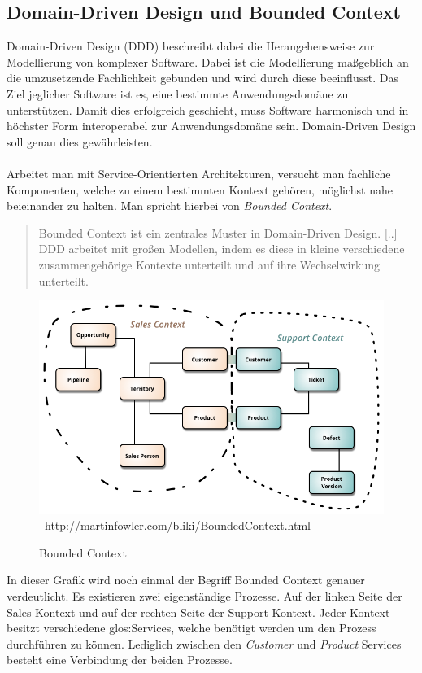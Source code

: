 \subsection{Domain-Driven Design und Bounded Context}
\label{sec:boundedContext}
Domain-Driven Design (DDD) beschreibt dabei die Herangehensweise zur Modellierung von komplexer Software. Dabei ist die Modellierung maßgeblich an die umzusetzende Fachlichkeit gebunden und wird durch diese beeinflusst. Das Ziel jeglicher Software ist es, eine bestimmte Anwendungsdomäne zu unterstützen. Damit dies erfolgreich geschieht, muss Software harmonisch und in höchster Form interoperabel zur Anwendungsdomäne sein. Domain-Driven Design soll genau dies gewährleisten.
\\\\
Arbeitet man mit Service-Orientierten Architekturen, versucht man fachliche Komponenten, welche zu einem bestimmten Kontext gehören, möglichst nahe beieinander zu halten. Man spricht hierbei von \textit{Bounded Context}. 
\begin{quotation}
    \frqq Bounded Context ist ein zentrales Muster in Domain-Driven Design. [..] DDD arbeitet mit großen Modellen, indem es diese in kleine verschiedene zusammengehörige Kontexte unterteilt und auf ihre Wechselwirkung unterteilt.\flqq\ \cite{mfowler:BoundedContext}
\end{quotation}

\begin{figure}[htb]
    \centering 
    \includegraphics[width=\linewidth]{content/images/BoundedContext}\
    \quelle\url{http://martinfowler.com/bliki/BoundedContext.html}
    \caption[Bounded Context]{Bounded Context\\}
    \label{fig:BoundedContext}  
\end{figure} 
In dieser Grafik wird noch einmal der Begriff Bounded Context genauer verdeutlicht. Es existieren zwei eigenständige Prozesse. Auf der linken Seite der Sales Kontext und auf der rechten Seite der Support Kontext. Jeder Kontext besitzt verschiedene \gls{glos:Services}, welche benötigt werden um den Prozess durchführen zu können. Lediglich zwischen den \textit{Customer} und \textit{Product} Services besteht eine Verbindung der beiden Prozesse.

